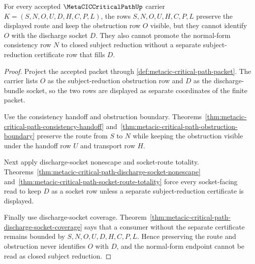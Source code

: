 \begin{theorem}
\label{thm:metacic-critical-path-subject-reduction-socket-separation}
For every accepted $\MetaCICCriticalPathUp$ carrier $K=(S,N,O,U,D,H,C,P,L)$, the rows $S,N,O,U,H,C,P,L$ preserve the displayed route and keep the obstruction row $O$ visible, but they cannot identify $O$ with the discharge socket $D$. They also cannot promote the normal-form consistency row $N$ to closed subject reduction without a separate subject-reduction certificate row that fills $D$.
\end{theorem}
\begin{proof}
Project the accepted packet through \autoref{def:metacic-critical-path-packet}. The carrier lists $O$ as the subject-reduction obstruction row and $D$ as the discharge-bundle socket, so the two rows are displayed as separate coordinates of the finite packet.

Use the consistency handoff and obstruction boundary. Theorems~\ref{thm:metacic-critical-path-consistency-handoff} and~\ref{thm:metacic-critical-path-obstruction-boundary} preserve the route from $S$ to $N$ while keeping the obstruction visible under the handoff row $U$ and transport row $H$.

Next apply discharge-socket nonescape and socket-route totality. Theorems~\ref{thm:metacic-critical-path-discharge-socket-nonescape} and~\ref{thm:metacic-critical-path-socket-route-totality} force every socket-facing read to keep $D$ as a socket row unless a separate subject-reduction certificate is displayed.

Finally use discharge-socket coverage. Theorem~\ref{thm:metacic-critical-path-discharge-socket-coverage} says that a consumer without the separate certificate remains bounded by $S,N,O,U,D,H,C,P,L$. Hence preserving the route and obstruction never identifies $O$ with $D$, and the normal-form endpoint cannot be read as closed subject reduction.
\end{proof}
